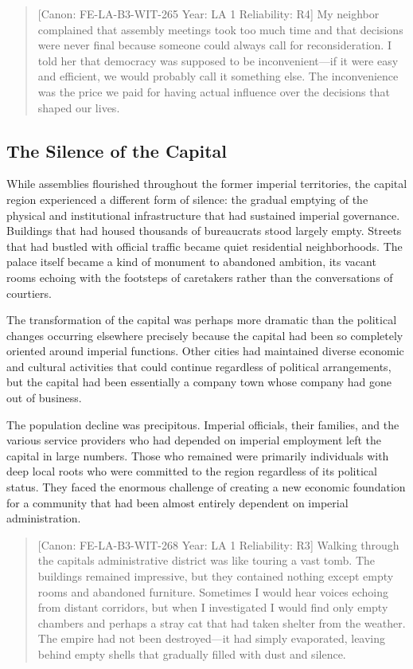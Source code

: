 \begin{quote}
{[}Canon: FE-LA-B3-WIT-265 \textbar{} Year: LA 1 \textbar{} Reliability:
R4{]} My neighbor complained that assembly meetings took too much time
and that decisions were never final because someone could always call
for reconsideration. I told her that democracy was supposed to be
inconvenient---if it were easy and efficient, we would probably call it
something else. The inconvenience was the price we paid for having
actual influence over the decisions that shaped our lives.
\end{quote}

\subsection{The Silence of the
Capital}\label{the-silence-of-the-capital}

While assemblies flourished throughout the former imperial territories,
the capital region experienced a different form of silence: the gradual
emptying of the physical and institutional infrastructure that had
sustained imperial governance. Buildings that had housed thousands of
bureaucrats stood largely empty. Streets that had bustled with official
traffic became quiet residential neighborhoods. The palace itself became
a kind of monument to abandoned ambition, its vacant rooms echoing with
the footsteps of caretakers rather than the conversations of courtiers.

The transformation of the capital was perhaps more dramatic than the
political changes occurring elsewhere precisely because the capital had
been so completely oriented around imperial functions. Other cities had
maintained diverse economic and cultural activities that could continue
regardless of political arrangements, but the capital had been
essentially a company town whose company had gone out of business.

The population decline was precipitous. Imperial officials, their
families, and the various service providers who had depended on imperial
employment left the capital in large numbers. Those who remained were
primarily individuals with deep local roots who were committed to the
region regardless of its political status. They faced the enormous
challenge of creating a new economic foundation for a community that had
been almost entirely dependent on imperial administration.

\begin{quote}
{[}Canon: FE-LA-B3-WIT-268 \textbar{} Year: LA 1 \textbar{} Reliability:
R3{]} Walking through the capital\textquotesingle s administrative
district was like touring a vast tomb. The buildings remained
impressive, but they contained nothing except empty rooms and abandoned
furniture. Sometimes I would hear voices echoing from distant corridors,
but when I investigated I would find only empty chambers and perhaps a
stray cat that had taken shelter from the weather. The empire had not
been destroyed---it had simply evaporated, leaving behind empty shells
that gradually filled with dust and silence.
\end{quote}

